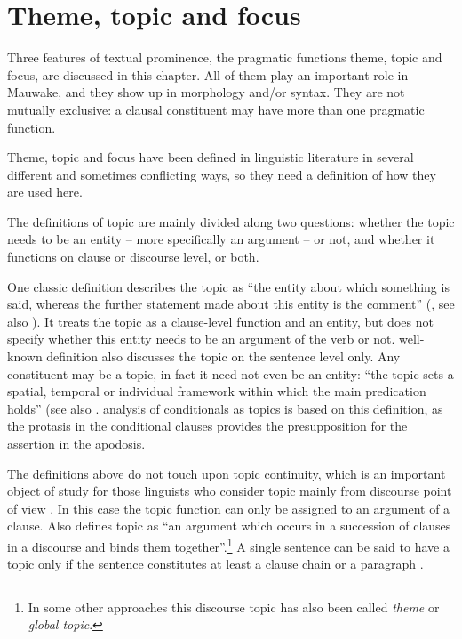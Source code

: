 
\chapter{Theme, topic and focus}

Three features of textual prominence, the pragmatic functions theme, topic and focus, are discussed in this chapter. All of them play an important role in Mauwake, and they show up in morphology and/or syntax. They are not mutually exclusive: a clausal constituent may have more than one pragmatic function. 

Theme, topic and focus have been defined in linguistic literature in several different and sometimes conflicting ways, so they need a definition of how they are used here. 

The definitions of topic are mainly divided along two questions: whether the topic needs to be an entity -- more specifically an argument -- or not, and whether it functions on clause or discourse level, or both. 

One classic definition describes the topic as ``the entity about which something is said, whereas the further statement made about this entity is the comment'' (\citealt{Crystal1997}, see also \citealt[19]{Dik1978}). It treats the topic as a clause-level function and an entity, but does not specify whether this entity needs to be an argument of the verb or not.   well-known definition also discusses the topic on the sentence level only. Any constituent may be a topic, in fact it need not even be an entity: ``the topic sets a spatial, temporal or individual framework within which the main predication holds'' (see also \citealt[461]{LiEtAl1976}.  analysis of conditionals as topics is based on this definition, as the protasis in the conditional clauses provides the presupposition for the assertion in the apodosis.

The definitions above do not touch upon topic continuity, which is an important  object of study for those linguists who consider topic mainly from discourse point of view \citep{Givon1976, Givon1983a, Givon1990}.  In this case the topic function can only be assigned to an argument of a clause. Also \citet[340]{Dixon2010a} defines topic as ``an argument which occurs in a succession of clauses in a discourse and binds them together''.\footnote{In some other approaches this discourse topic has also been called \textit{theme} or \textit{global topic}.} A single sentence can be said to have a topic only if the sentence constitutes at least a clause chain or a paragraph \citep[902]{Givon1990}. 

